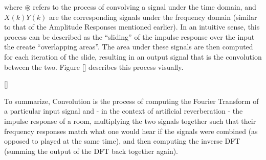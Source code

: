 where $\circledast$ refers to the process of convolving a signal under the time domain, and $X(k)Y(k)$ are the corresponding signals under the frequency domain (similar to that of the Amplitude Responses mentioned earlier). In an intuitive sense, this process can be described as the ``sliding'' of the impulse response over the input the create ``overlapping areas''. The area under these signals are then computed for each iteration of the slide, resulting in an output signal that is the convolution between the two. Figure [] describes this process visually.

[]

To summarize, Convolution is the process of computing the Fourier Transform of a particular input signal and - in the context of artificial reverberation - the impulse response of a room, multiplying the two signals together such that their frequency responses match what one would hear if the signals were combined (as opposed to played at the same time), and then computing the inverse DFT (summing the output of the DFT back together again).
